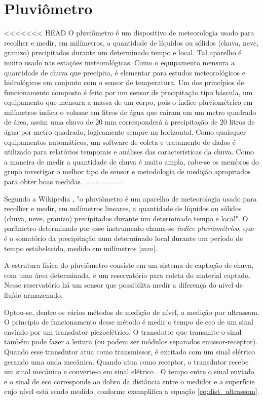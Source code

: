 \documentclass[12pt,a4paper]{instrumentacao}
\begin{document}
\section{Pluviômetro}
<<<<<<< HEAD
O pluviômetro é um dispositivo de meteorologia usado para recolher e medir, em milímetros, a quantidade de líquidos ou sólidos (chuva, neve, granizo) precipitados durante um determinado tempo e local. Tal aparelho é muito usado nas estações meteorológicas. Como o equipamento mensura a quantidade de chuva que precipita, é elementar para estudos meteorológicos e hidrológicos em conjunto com o sensor de temperatura. Um dos princípios de funcionamento composto é feito por um sensor de precipitação tipo báscula, um equipamento que mensura a massa de um corpo, pois o índice pluviométrico em milímetros indica o volume em litros de água que caíram em um metro quadrado de área, assim uma chuva de 20 mm corresponderá à precipitação de 20 litros de água por metro quadrado, logicamente sempre na horizontal. Como quaisquer equipamentos automáticos, um software de coleta e tratamento de dados é utilizado para relatórios temporais e análises das características da chuva. Como a maneira de medir a quantidade de chuva é muito ampla, cabe-se os membros do grupo investigar o melhor tipo de sensor e metodologia de medição apropriados para obter boas medidas. 
=======

Segundo a Wikipedia \cite{pluviometro}, "o pluviômetro é um aparelho de meteorologia usado para recolher e medir, em milímetros lineares, a quantidade de líquidos ou sólidos (chuva, neve, granizo) precipitados durante um determinado tempo e local". O parâmetro determinado por esse instrumento chama-se \textit{índice pluviométrico}, que é o somatório da precipitação num determinado local durante um período de tempo estabelecido, medido em milímetros [$mm$].

A estrutura física do pluviômetro consiste em um sistema de captação de chuva, com uma área determinada, e um reservatório para coleta do material captado. Nesse reservatório há um sensor que possibilita medir a diferença do nível de fluído armazenado.

Optou-se, dentre os vários métodos de medição de nível, a medição por ultrassom. O princípio de funcionamento desse método é medir o tempo de eco de um sinal enviado por um transdutor piezoelétrico. O transdutor que transmite o sinal também pode fazer a leitura (ou podem ser módulos separados emissor-receptor). Quando esse transdutor atua como transmissor, é excitado com um sinal elétrico gerando uma onda mecânica. Quando atua como receptor, o transdutor recebe um sinal mecânico e converte-o em sinal elétrico \cite{livro-texto}. O tempo entre o sinal enviado e o sinal de eco corresponde ao dobro da distância entre o medidor e a superfície cujo nível está sendo medido, conforme exemplifica a equação \ref{eq:dist_ultrassom}.
\end{document}
